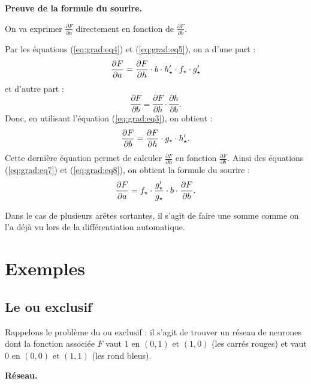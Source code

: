 {\bigskip
\textbf{Preuve de la formule du sourire.}

On va exprimer $\frac{\partial F}{\partial a}$ directement en fonction de $\frac{\partial F}{\partial b}$.

Par les équations (\ref{eq:grad:eq4}) et (\ref{eq:grad:eq5}), on a d'une part :
\begin{equation}
	\frac{\partial F}{\partial a} =   \frac{\partial F}{\partial h} \cdot b \cdot  h'_\star \cdot f_\star \cdot g'_\star
	\label{eq:grad:eq7}
\end{equation}
et d'autre part :
$$\frac{\partial F}{\partial b} =  \frac{\partial F}{\partial h} \cdot \frac{\partial h}{\partial b}.$$
Donc, en utilisant l'équation (\ref{eq:grad:eq3}), on obtient :
\begin{equation}
	\frac{\partial F}{\partial b} =   \frac{\partial F}{\partial h} \cdot g_\star \cdot  h'_\star.
	\label{eq:grad:eq8}
\end{equation}
Cette dernière équation permet de calculer $\frac{\partial F}{\partial h}$ en fonction $\frac{\partial F}{\partial b}$. Ainsi des équations (\ref{eq:grad:eq7}) et (\ref{eq:grad:eq8}), on obtient la formule du sourire :
$$\frac{\partial F}{\partial a} = f_\star \cdot \frac{g'_\star}{g_\star} \cdot b \cdot \frac{\partial F}{\partial b}.$$

Dans le cas de plusieurs arêtes sortantes, il s'agit de faire une somme comme on l'a déjà vu lors de la différentiation automatique.



\section{Exemples}

\subsection{Le \og{}ou exclusif\fg{}}

Rappelons le problème du \og{}ou exclusif\fg{} : il s'agit de trouver un réseau de neurones dont la fonction associée $F$ vaut $1$ en $(0,1)$ et $(1,0)$ (les carrés rouges) et vaut $0$ en $(0,0)$ et $(1,1)$ (les rond bleus).


\textbf{Réseau.}

}

